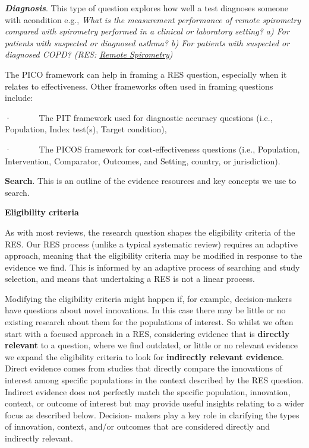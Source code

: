 \documentclass[
  letterpaper,
  DIV=11,
  numbers=noendperiod]{scrreprt}
\begin{document}
\textbf{\emph{Diagnosis}}. This type of question explores how well a
test diagnoses someone with acondition e.g., \emph{What is the
measurement performance of remote spirometry compared with spirometry
performed in a clinical or laboratory setting? a) For patients with
suspected or diagnosed asthma? b) For patients with suspected or
diagnosed COPD? (RES:
\href{https://arc-gm.nihr.ac.uk/rapid-evidence-synthesis}{Remote
Spirometry})}

The PICO framework can help in framing a RES question, especially when
it relates to effectiveness. Other frameworks often used in framing
questions include:~

·~~~~~~ The PIT framework used for diagnostic accuracy questions (i.e.,
Population, Index test(s), Target condition),

·~~~~~~ The PICOS framework for cost-effectiveness questions (i.e.,
Population, Intervention, Comparator, Outcomes, and Setting, country, or
jurisdiction).

\textbf{Search}. This is an outline of the evidence resources and key
concepts we use to search.

\textbf{Eligibility criteria}

As with most reviews, the research question shapes the eligibility
criteria of the RES. Our RES process (unlike a typical systematic
review) requires an adaptive approach, meaning that the eligibility
criteria may be modified in response to the evidence we find. This is
informed by an adaptive process of searching and study selection, and
means that undertaking a RES is not a linear process.

Modifying the eligibility criteria might happen if, for example,
decision-makers have questions about novel innovations. In this case
there may be little or no existing research about them for the
populations of interest. So whilst we often start with a focused
approach in a RES, considering evidence that is \textbf{directly
relevant} to a question, where we find outdated, or little or no
relevant evidence we expand the eligibility criteria to look for
\textbf{indirectly relevant evidence}. Direct evidence comes from
studies that directly compare the innovations of interest among specific
populations in the context described by the RES question. Indirect
evidence does not perfectly match the specific population, innovation,
context, or outcome of interest but may provide useful insights relating
to a wider focus as described below. Decision- makers play a key role in
clarifying the types of innovation, context, and/or outcomes that are
considered directly and indirectly relevant.
\end{document}
